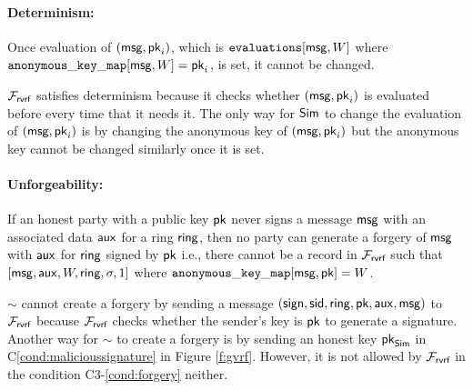 \paragraph{Determinism:} Once evaluation of $ (\mathsf{msg}, \mathsf{pk}_i) $, which is $ \texttt{evaluations}[\mathsf{msg},W] $ where $ \mathtt{anonymous\_key\_map}[\mathsf{msg},W] = \mathsf{pk}_i $, is set, it cannot be changed. 

$ \mathcal{F}_{\textsf{rvrf}} $ satisfies determinism because it checks whether $ (\mathsf{msg}, \mathsf{pk}_i) $ is evaluated before every time that it needs it. The only way for $ \mathsf{Sim} $ to change the evaluation of $ (\mathsf{msg}, \mathsf{pk}_i) $ is by changing the anonymous key of $ (\mathsf{msg}, \mathsf{pk}_i)  $ but the anonymous key cannot be changed similarly once it is set.

\paragraph{Unforgeability:}  If an honest party with a public key $ \mathsf{pk} $ never signs a message $ \mathsf{msg} $  with an associated data $ \mathsf{aux} $ for a ring $ \mathsf{ring} $, then no party can generate a  forgery of $ \mathsf{msg} $ with $ \mathsf{aux} $ for $ \mathsf{ring} $ signed by $ \mathsf{pk} $ i.e., there cannot be a record in $ \mathcal{F}_{\textsf{rvrf}} $ such that $ [\mathsf{msg}, \mathsf{aux},W,\mathsf{ring}, \sigma, 1] $ where $ \mathtt{anonymous\_key\_map}[\mathsf{msg},\mathsf{pk}] = W $.

$ \sim $ cannot create a forgery by sending a message $ (\mathsf{sign}, \textsf{sid},\mathsf{ring},\mathsf{pk},\mathsf{aux},\mathsf{msg}) $ to $ \mathcal{F}_{\textsf{rvrf}} $ because $ \mathcal{F}_{\textsf{rvrf}} $ checks whether the sender's key is $ \mathsf{pk} $ to generate a signature. Another way for $ \sim $ to create a forgery is by sending an honest key $ \mathsf{pk}_{\mathsf{Sim}} $  in C\ref{cond:malicioussignature} in Figure \ref{f:gvrf}. However, it is not allowed by $ \mathcal{F}_{\textsf{rvrf}} $ in the condition C3-\ref{cond:forgery} neither.

